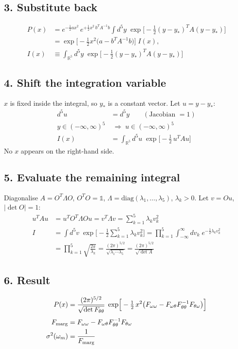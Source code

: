 \documentclass[11pt]{article}
\begin{document}
\subsection*{3. Substitute back}
\begin{align}
P(x) &= e^{-\frac12 a x^2}\,e^{+\frac12 x^2\, b^{T}A^{-1}b}\int d^5y\; \exp\!\Big[-\tfrac12 (y-y_*)^{T}A(y-y_*)\Big] \\
&= \exp\!\Big[-\tfrac12 x^2\big(a - b^{T}A^{-1}b\big)\Big]\; I(x), \\[4pt]
I(x) &\equiv \int_{\mathbb{R}^5} d^5y\; \exp\!\Big[-\tfrac12 (y-y_*)^{T}A(y-y_*)\Big]
\end{align}

\subsection*{4. Shift the integration variable}
$x$ is fixed inside the integral, so $y_*$ is a constant vector. Let $u = y - y_*$:
\begin{align}
d^5u &= d^5y \qquad (\text{Jacobian } =1) \\
y\in(-\infty,\infty)^5 &\;\Rightarrow\; u\in(-\infty,\infty)^5 \\
I(x) &= \int_{\mathbb{R}^5} d^5u\; \exp\!\Big[-\tfrac12\, u^{T}Au\Big]
\end{align}
No $x$ appears on the right-hand side.

\subsection*{5. Evaluate the remaining integral}
Diagonalise $A = O^{T}\Lambda O$, $O^{T}O=\mathbb{1}$, $\Lambda=\mathrm{diag}(\lambda_1,\dots,\lambda_5)$, $\lambda_k>0$. Let $v=Ou$, $|\det O|=1$:
\begin{align}
u^{T}Au &= u^{T}O^{T}\Lambda O u = v^{T}\Lambda v = \sum_{k=1}^{5}\lambda_k v_k^2 \\
I &= \int d^5v\; \exp\!\Big[-\tfrac12\sum_{k=1}^{5}\lambda_k v_k^2\Big]
   = \prod_{k=1}^{5}\int_{-\infty}^{\infty} dv_k\; e^{-\frac12\lambda_k v_k^2} \\
&= \prod_{k=1}^{5}\sqrt{\frac{2\pi}{\lambda_k}}
 = \frac{(2\pi)^{5/2}}{\sqrt{\lambda_1\cdots\lambda_5}}
 = \frac{(2\pi)^{5/2}}{\sqrt{\det A}}
\end{align}

\subsection*{6. Result}
\begin{align}
P(x) &= \frac{(2\pi)^{5/2}}{\sqrt{\det F_{\theta\theta}}}\;
\exp\!\Big[-\tfrac12\, x^2\big(F_{\omega\omega} - F_{\omega\theta}F_{\theta\theta}^{-1}F_{\theta\omega}\big)\Big] \\[4pt]
F_{\rm marg} &= F_{\omega\omega} - F_{\omega\theta}F_{\theta\theta}^{-1}F_{\theta\omega} \\
\sigma^2(\omega_m) &= \frac{1}{F_{\rm marg}}
\end{align}
\end{document}
